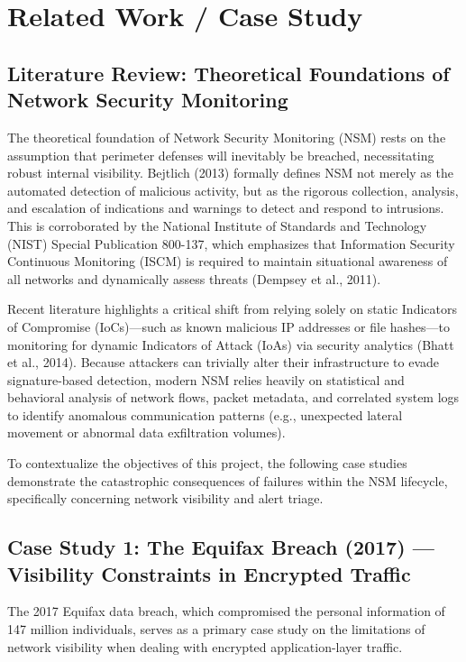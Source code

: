 \section{Related Work / Case Study}
\label{sec:related}

\subsection{Literature Review: Theoretical Foundations of Network Security Monitoring}

The theoretical foundation of Network Security Monitoring (NSM) rests on the assumption that perimeter defenses will inevitably be breached, necessitating robust internal visibility. Bejtlich (2013) formally defines NSM not merely as the automated detection of malicious activity, but as the rigorous collection, analysis, and escalation of indications and warnings to detect and respond to intrusions. This is corroborated by the National Institute of Standards and Technology (NIST) Special Publication 800-137, which emphasizes that Information Security Continuous Monitoring (ISCM) is required to maintain situational awareness of all networks and dynamically assess threats (Dempsey et al., 2011).

Recent literature highlights a critical shift from relying solely on static Indicators of Compromise (IoCs)---such as known malicious IP addresses or file hashes---to monitoring for dynamic Indicators of Attack (IoAs) via security analytics (Bhatt et al., 2014). Because attackers can trivially alter their infrastructure to evade signature-based detection, modern NSM relies heavily on statistical and behavioral analysis of network flows, packet metadata, and correlated system logs to identify anomalous communication patterns (e.g., unexpected lateral movement or abnormal data exfiltration volumes).

To contextualize the objectives of this project, the following case studies demonstrate the catastrophic consequences of failures within the NSM lifecycle, specifically concerning network visibility and alert triage.

\subsection{Case Study 1: The Equifax Breach (2017) --- Visibility Constraints in Encrypted Traffic}
\label{sec:equifax}

The 2017 Equifax data breach, which compromised the personal information of 147 million individuals, serves as a primary case study on the limitations of network visibility when dealing with encrypted application-layer traffic.

